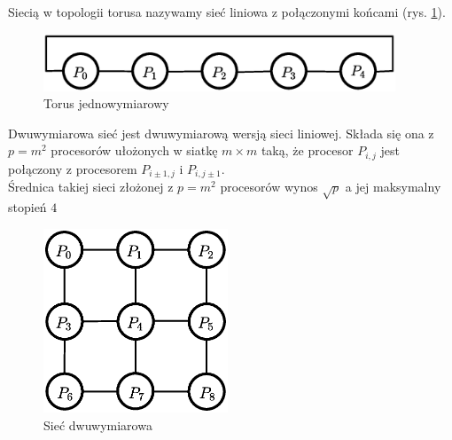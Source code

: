 \begin{przyklad}[Torus]
Siecią w topologii torusa nazywamy sieć liniowa z połączonymi końcami (rys. \ref{fig:model_torus1d}).
\begin{figure}[h]
\centering
\includegraphics[width=10.5cm]{images/torus1d}
\caption{Torus jednowymiarowy}
\label{fig:model_torus1d}
\end{figure}

\end{przyklad}

\begin{przyklad}
Dwuwymiarowa sieć jest dwuwymiarową wersją sieci liniowej. Składa się ona z \(p=m^2\) procesorów ułożonych w siatkę \(m\times m\) taką, że procesor \(P_{i,j}\) jest połączony z procesorem \(P_{i\pm 1, j}\) i \(P_{i, j\pm 1}\).\\
Średnica takiej sieci złożonej z \(p=m^2\) procesorów wynos \(\sqrt{p}\) a jej maksymalny stopień \(4\)
\begin{figure}[h]
\centering
\includegraphics[width=5.5cm]{images/mesh2d}
\caption{Sieć dwuwymiarowa}
\label{fig:model_mesh2d}
\end{figure}
\end{przyklad}

